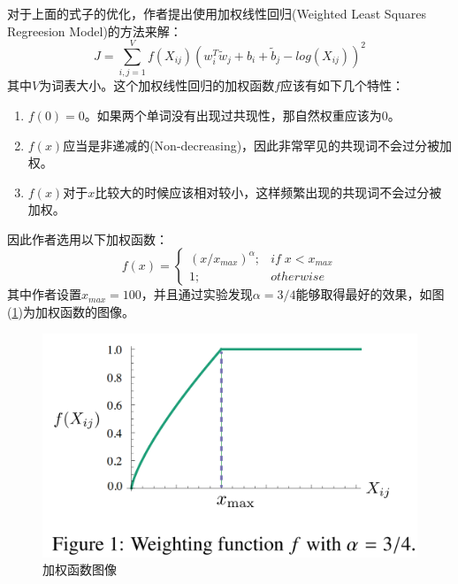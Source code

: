 \documentclass[UTF8, 12pt]{ctexart}
\begin{document}
	对于上面的式子的优化，作者提出使用加权线性回归(Weighted Least Squares Regreesion Model)的方法来解：
	\begin{equation}
		J = \sum_{i, j = 1}^{V} f(X_{ij}) (w_{i}^{T}\tilde{w}_{j} + b_{i} + \tilde{b}_{j} - log(X_{ij}))^2
		\label{glove_loss}
	\end{equation}
	其中$V$为词表大小。这个加权线性回归的加权函数$f$应该有如下几个特性：
	\begin{enumerate}
		\item $f(0) = 0$。如果两个单词没有出现过共现性，那自然权重应该为0。
		\item $f(x)$应当是非递减的(Non-decreasing)，因此非常罕见的共现词不会过分被加权。
		\item $f(x)$对于$x$比较大的时候应该相对较小，这样频繁出现的共现词不会过分被加权。
	\end{enumerate}
	因此作者选用以下加权函数：
	\begin{equation}
	f(x) = 
		\begin{cases}
			(x / x_{max})^{\alpha}; & if \; x < x_{max} \\
			1; & otherwise
		\end{cases}
	\end{equation}
	其中作者设置$x_{max} = 100$，并且通过实验发现$\alpha = 3/4$能够取得最好的效果，如图(\ref{fig_1})为加权函数的图像。

	\begin{figure}[H]
		\centering
		\includegraphics[width=0.45\linewidth]{..//Plots//fig_1.png}
		\caption{加权函数图像}
		\label{fig_1}
		\vspace{-0.5em}
	\end{figure}
\end{document}
